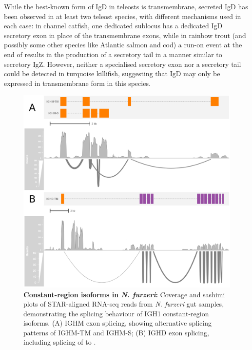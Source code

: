 	While the best-known form of IgD in teleosts is transmembrane, secreted IgD has been observed in at least two teleost species, with different mechanisms used in each case: in channel catfish, one dedicated sublocus has a dedicated IgD secretory exon in place of the transmembrane exons, while in rainbow trout (and possibly some other species like Atlantic salmon and cod) a run-on event at the end of  results in the production of a secretory tail in a manner similar to secretory IgZ. However, neither a specialised secretory exon nor a  secretory tail could be detected in turquoise killifish, suggesting that IgD may only be expressed in transmembrane form in this species. %

	
	\begin{figure}
	\includegraphics[width=\textwidth]{_Figures/png/nfu-locus-sashimi}
	\caption[Constant-region isoforms in \textit{N. furzeri}]{\textbf{Constant-region isoforms in \textit{N. furzeri}:} Coverage and sashimi plots of STAR-aligned RNA-seq reads from \textit{N. furzeri} gut samples, demonstrating the splicing behaviour of IGH1 constant-region isoforms. (A) IGHM exon splicing, showing alternative splicing patterns of IGHM-TM and IGHM-S; (B) IGHD exon splicing, including splicing of  to .}
	\label{fig:nfu-locus-sashimi}
	\end{figure}
	




